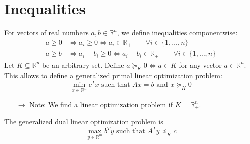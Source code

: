 \documentclass[12pt, openany]{report}
\newcommand{\R}{\mathbb{R}}
\theoremstyle{definition}
\begin{document}
\section{Inequalities}
For vectors of real numbers $a,b\in \R^n$, we define inequalities componentwise:
\begin{equation}
    \begin{aligned}
        a\ge 0 &\Leftrightarrow a_i\ge 0 \Leftrightarrow a_i\in \R_+ \qquad \forall i\in \{1,\ldots,n\}    \\
        a\ge b & \Leftrightarrow a_i- b_i\ge 0 \Leftrightarrow a_i-b_i\in \R_+ \qquad \forall i\in \{1,\ldots,n\}
    \end{aligned}
\end{equation}
Let $K\subseteq \R^n$ be an arbitrary set. Define $a\succeq_K0\Leftrightarrow a\in K$ for any vector $a\in \R^n$.\\ This allows to define a generalized primal linear optimization problem:
\begin{equation}
    \min_{x\in \R^n} c^Tx\text{ such that }Ax=b \text{ and }x\succeq_K0
\end{equation}
\begin{itemize}
    \item [$\rightarrow$] Note: We find a linear optimization problem if $K=\R^n_+$.
\end{itemize}
The generalized dual linear optimization problem is 
\begin{equation}
    \max_{y\in \R^m}b^Ty \text{ such that } A^Ty\preceq_K c
\end{equation}
\end{document}
